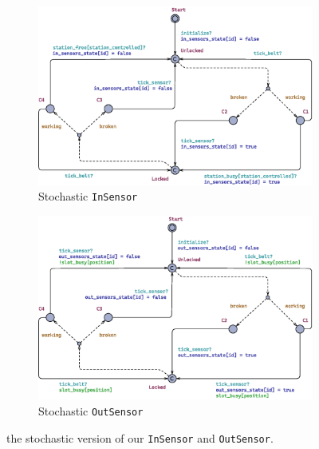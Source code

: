 \documentclass[a4paper]{article}
\begin{document}
    \begin{figure}[h!]
        \begin{subfigure}{0.49\linewidth}
            \includegraphics[width=\textwidth]{images/automata/in_sensor_s}
            \caption{Stochastic \texttt{InSensor}}
        \end{subfigure}
        \begin{subfigure}{0.49\linewidth}
            \includegraphics[width=\textwidth]{images/automata/out_sensor_s}
            \caption{Stochastic \texttt{OutSensor}}
        \end{subfigure}
        \caption{the stochastic version of our \texttt{InSensor} and \texttt{OutSensor}.}
        \label{figure:stochastic_sensors}
    \end{figure}
\end{document}
